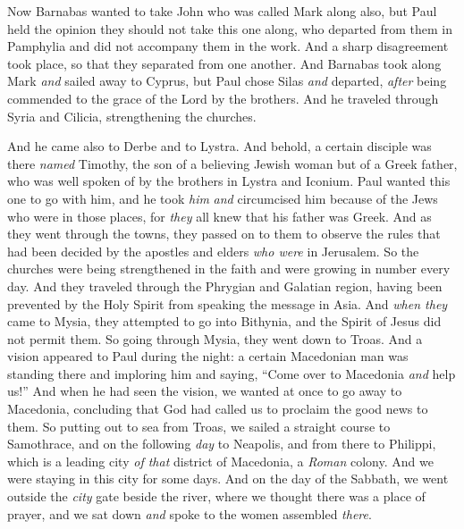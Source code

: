 \begin{biblechapter}
\verse Now Barnabas wanted to take John who was called Mark along also,
\verse but Paul held the opinion they should not take this one along, who departed from them in Pamphylia and did not accompany them in the work.
\verse And a sharp disagreement took place, so that they separated from one another. And Barnabas took along Mark \textit{and} sailed away to Cyprus,
\verse but Paul chose Silas \textit{and} departed, \textit{after} being commended to the grace of the Lord by the brothers.
\verse And he traveled through Syria and Cilicia, strengthening the churches.
\end{biblechapter}

\begin{biblechapter} %
 And he came also to Derbe and to Lystra. And behold, a certain disciple was there \textit{named} Timothy, the son of a believing Jewish woman but of a Greek father,
\verse who was well spoken of by the brothers in Lystra and Iconium.
\verse Paul wanted this one to go with him, and he took \textit{him} \textit{and} circumcised him because of the Jews who were in those places, for \textit{they} all knew that his father was Greek.
\verse And as they went through the towns, they passed on to them to observe the rules that had been decided by the apostles and elders \textit{who were} in Jerusalem.
\verse So the churches were being strengthened in the faith and were growing in number every day.
 And they traveled through the Phrygian and Galatian region, having been prevented by the Holy Spirit from speaking the message in Asia.
\verse And \textit{when they} came to Mysia, they attempted to go into Bithynia, and the Spirit of Jesus did not permit them.
\verse So going through Mysia, they went down to Troas.
\verse And a vision appeared to Paul during the night: a certain Macedonian man was standing there and imploring him and saying, “Come over to Macedonia \textit{and} help us!”
\verse And when he had seen the vision, we wanted at once to go away to Macedonia, concluding that God had called us to proclaim the good news to them.
 So putting out to sea from Troas, we sailed a straight course to Samothrace, and on the following \textit{day} to Neapolis,
\verse and from there to Philippi, which is a leading city \textit{of that} district of Macedonia, a \textit{Roman} colony. And we were staying in this city for some days.
\verse And on the day of the Sabbath, we went outside the \textit{city} gate beside the river, where we thought there was a place of prayer, and we sat down \textit{and} spoke to the women assembled \textit{there}.

\end{biblechapter}
